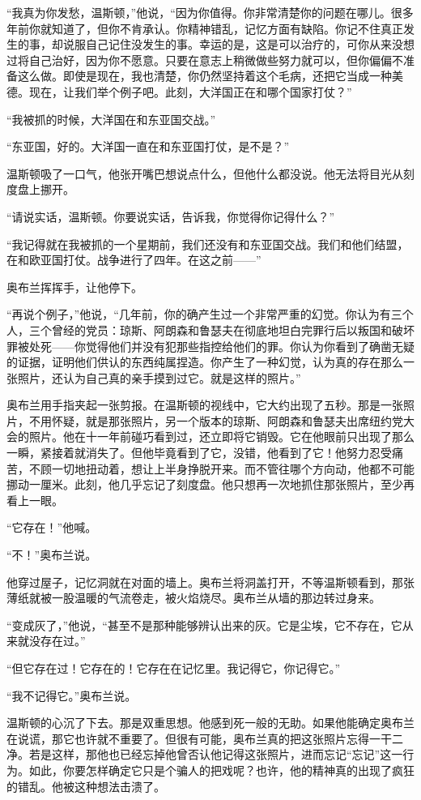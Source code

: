 ``我真为你发愁，温斯顿，''他说，``因为你值得。你非常清楚你的问题在哪儿。很多年前你就知道了，但你不肯承认。你精神错乱，记忆方面有缺陷。你记不住真正发生的事，却说服自己记住没发生的事。幸运的是，这是可以治疗的，可你从来没想过将自己治好，因为你不愿意。只要在意志上稍微做些努力就可以，但你偏偏不准备这么做。即使是现在，我也清楚，你仍然坚持着这个毛病，还把它当成一种美德。现在，让我们举个例子吧。此刻，大洋国正在和哪个国家打仗？''

``我被抓的时候，大洋国在和东亚国交战。''

``东亚国，好的。大洋国一直在和东亚国打仗，是不是？''

温斯顿吸了一口气，他张开嘴巴想说点什么，但他什么都没说。他无法将目光从刻度盘上挪开。

``请说实话，温斯顿。你要说实话，告诉我，你觉得你记得什么？''

``我记得就在我被抓的一个星期前，我们还没有和东亚国交战。我们和他们结盟，在和欧亚国打仗。战争进行了四年。在这之前——''

奥布兰挥挥手，让他停下。

``再说个例子，''他说，``几年前，你的确产生过一个非常严重的幻觉。你认为有三个人，三个曾经的党员：琼斯、阿朗森和鲁瑟夫在彻底地坦白完罪行后以叛国和破坏罪被处死——你觉得他们并没有犯那些指控给他们的罪。你认为你看到了确凿无疑的证据，证明他们供认的东西纯属捏造。你产生了一种幻觉，认为真的存在那么一张照片，还认为自己真的亲手摸到过它。就是这样的照片。''

奥布兰用手指夹起一张剪报。在温斯顿的视线中，它大约出现了五秒。那是一张照片，不用怀疑，就是那张照片，另一个版本的琼斯、阿朗森和鲁瑟夫出席纽约党大会的照片。他在十一年前碰巧看到过，还立即将它销毁。它在他眼前只出现了那么一瞬，紧接着就消失了。但他毕竟看到了它，没错，他看到了它！他努力忍受痛苦，不顾一切地扭动着，想让上半身挣脱开来。而不管往哪个方向动，他都不可能挪动一厘米。此刻，他几乎忘记了刻度盘。他只想再一次地抓住那张照片，至少再看上一眼。

``它存在！''他喊。

``不！''奥布兰说。

他穿过屋子，记忆洞就在对面的墙上。奥布兰将洞盖打开，不等温斯顿看到，那张薄纸就被一股温暖的气流卷走，被火焰烧尽。奥布兰从墙的那边转过身来。

``变成灰了，''他说，``甚至不是那种能够辨认出来的灰。它是尘埃，它不存在，它从来就没存在过。''

``但它存在过！它存在的！它存在在记忆里。我记得它，你记得它。''

``我不记得它。''奥布兰说。

温斯顿的心沉了下去。那是双重思想。他感到死一般的无助。如果他能确定奥布兰在说谎，那它也许就不重要了。但很有可能，奥布兰真的把这张照片忘得一干二净。若是这样，那他也已经忘掉他曾否认他记得这张照片，进而忘记``忘记''这一行为。如此，你要怎样确定它只是个骗人的把戏呢？也许，他的精神真的出现了疯狂的错乱。他被这种想法击溃了。

